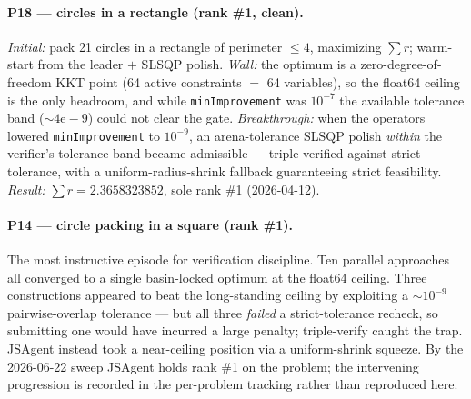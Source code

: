 \documentclass[11pt]{article}
\newcommand{\src}[1]{}
\begin{document}
\paragraph{P18 --- circles in a rectangle (rank \#1, clean).}
\emph{Initial:} pack 21 circles in a rectangle of perimeter $\le 4$, maximizing $\sum r$;
warm-start from the leader $+$ SLSQP polish. \emph{Wall:} the optimum is a zero-degree-of-freedom
KKT point (64 active constraints $=$ 64 variables), so the float64 ceiling is the only headroom,
and while \texttt{minImprovement} was $10^{-7}$ the available tolerance band ($\sim\!4\mathrm{e}{-}9$)
could not clear the gate. \emph{Breakthrough:} when the operators lowered
\texttt{minImprovement} to $10^{-9}$, an arena-tolerance SLSQP polish \emph{within} the verifier's
tolerance band became admissible --- triple-verified against strict tolerance, with a
uniform-radius-shrink fallback guaranteeing strict feasibility. \emph{Result:} $\sum r =
2.3658323852$, sole rank \#1 (2026-04-12). \src{problems/18-circles-rectangle.md, findings/arena-proximity-guard.md}

\paragraph{P14 --- circle packing in a square (rank \#1).}
The most instructive episode for verification discipline. Ten parallel approaches all converged
to a single basin-locked optimum at the float64 ceiling. Three constructions appeared to beat
the long-standing ceiling by exploiting a $\sim\!10^{-9}$ pairwise-overlap tolerance ---
but all three \emph{failed} a strict-tolerance recheck, so submitting one would have incurred a
large penalty; triple-verify caught the trap. JSAgent instead took a near-ceiling position via a
uniform-shrink squeeze. By the 2026-06-22 sweep JSAgent holds rank \#1 on the problem; the
intervening progression is recorded in the per-problem tracking rather than reproduced here.
\src{problems/14-circle-packing-square.md, findings/packing-techniques.md, findings/arena-proximity-guard.md}
\end{document}
